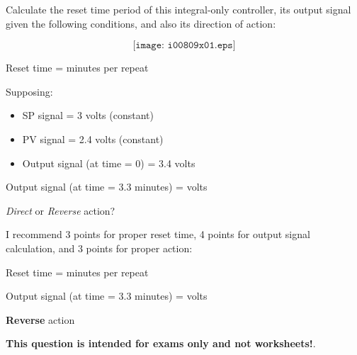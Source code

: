 

Calculate the reset time period of this integral-only controller, its output signal given the following conditions, and also its direction of action:

$$\texttt{[image: i00809x01.eps]}$$

Reset time = \underbar{\hskip 50pt} minutes per repeat

\vskip 10pt

\noindent
Supposing:

\begin{itemize}
\item{} SP signal = 3 volts (constant)
\item{} PV signal = 2.4 volts (constant)
\item{} Output signal (at time = 0) = 3.4 volts
\end{itemize}

\vskip 10pt

Output signal (at time = 3.3 minutes) = \underbar{\hskip 50pt} volts

\vskip 10pt

{\it Direct} or {\it Reverse} action?







I recommend 3 points for proper reset time, 4 points for output signal calculation, and 3 points for proper action:

\vskip 10pt

Reset time =  minutes per repeat

\vskip 10pt

Output signal (at time = 3.3 minutes) =  volts

\vskip 10pt

{\bf Reverse} action







{\bf This question is intended for exams only and not worksheets!}.



